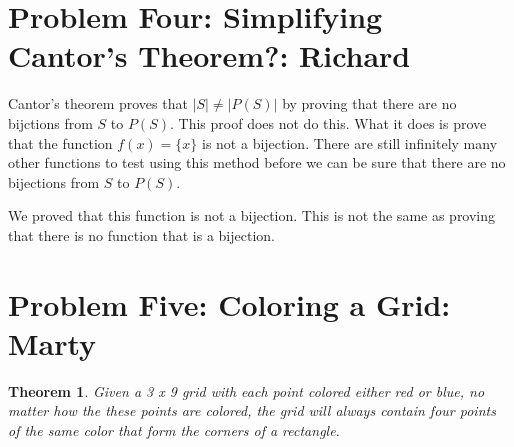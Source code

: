 \documentclass[10pt,letter]{article}
\newtheorem*{thm}{Theorem}
\begin{document}
\section*{Problem Four: Simplifying Cantor's Theorem?: Richard}
Cantor's theorem proves that $|S| \not = |P(S)|$ by proving that there are no bijctions from $S$ to $P(S)$. This proof does not do this. What it does is prove that the function $f(x) = \{x\}$ is not a bijection. There are still infinitely many other functions to test using this method before we can be sure that there are no bijections from $S$ to $P(S)$.

We proved that this function is not a bijection. This is not the same as proving that there is no function that is a bijection. 

\section*{Problem Five: Coloring a Grid: Marty}
\begin{thm} Given a 3 x 9 grid with each point colored either red or blue, no matter how the these points are colored, the grid will always contain four points of the same color that form the corners of a rectangle. 
\end{thm}
\end{document}
